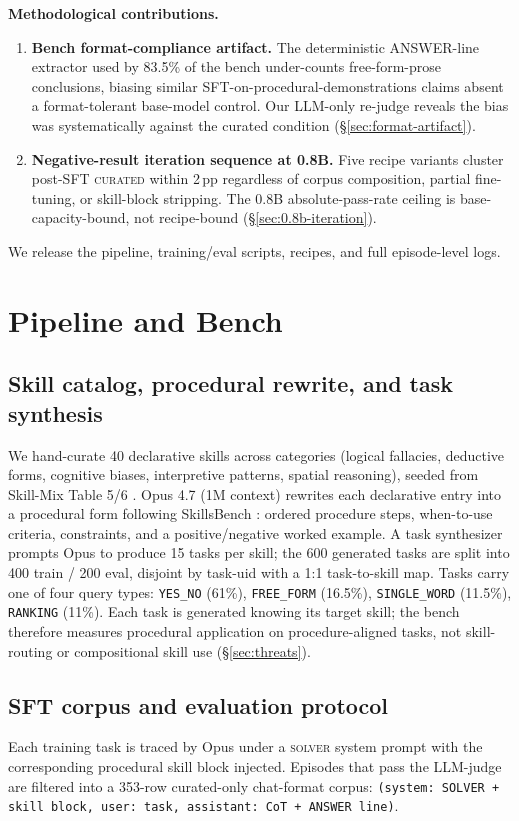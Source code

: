 \documentclass[10pt]{article}
\newcommand{\CU}{\textsc{curated}\xspace}
\begin{document}
\textbf{Methodological contributions.}
\begin{enumerate}[leftmargin=*, resume]
  \item \textbf{Bench format-compliance artifact.} The deterministic ANSWER-line extractor used by 83.5\% of the bench under-counts free-form-prose conclusions, biasing similar SFT-on-procedural-demonstrations claims absent a format-tolerant base-model control. Our LLM-only re-judge reveals the bias was systematically against the curated condition (\S\ref{sec:format-artifact}).
  \item \textbf{Negative-result iteration sequence at 0.8B.} Five recipe variants cluster post-SFT \CU{} within 2\,pp regardless of corpus composition, partial fine-tuning, or skill-block stripping. The 0.8B absolute-pass-rate ceiling is base-capacity-bound, not recipe-bound (\S\ref{sec:0.8b-iteration}).
\end{enumerate}

We release the pipeline, training/eval scripts, recipes, and full episode-level logs.

\section{Pipeline and Bench}

\subsection{Skill catalog, procedural rewrite, and task synthesis}
We hand-curate 40 declarative skills across categories (logical fallacies, deductive forms, cognitive biases, interpretive patterns, spatial reasoning), seeded from Skill-Mix Table 5/6 \citep{yu2024skillmix}. Opus 4.7 (1M context) rewrites each declarative entry into a procedural form following SkillsBench \citep{li2026skillsbench}: ordered procedure steps, when-to-use criteria, constraints, and a positive/negative worked example. A task synthesizer prompts Opus to produce 15 tasks per skill; the 600 generated tasks are split into 400 train / 200 eval, disjoint by task-uid with a 1:1 task-to-skill map. Tasks carry one of four query types: \texttt{YES\_NO} (61\%), \texttt{FREE\_FORM} (16.5\%), \texttt{SINGLE\_WORD} (11.5\%), \texttt{RANKING} (11\%). Each task is generated knowing its target skill; the bench therefore measures procedural application on procedure-aligned tasks, not skill-routing or compositional skill use (\S\ref{sec:threats}).

\subsection{SFT corpus and evaluation protocol}
Each training task is traced by Opus under a \textsc{solver} system prompt with the corresponding procedural skill block injected. Episodes that pass the LLM-judge \citep{zheng2023judging} are filtered into a 353-row curated-only chat-format corpus: \texttt{(system: SOLVER + skill block, user: task, assistant: CoT + ANSWER line)}.
\end{document}

